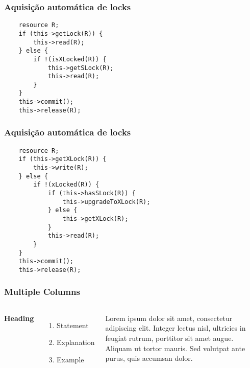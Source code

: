 \documentclass{beamer}
\begin{document}

\begin{frame}[fragile] %
\frametitle{Aquisição automática de locks}
\begin{example}
\begin{verbatim}
    resource R;
    if (this->getLock(R)) {
        this->read(R);
    } else {
        if !(isXLocked(R)) {
            this->getSLock(R);
            this->read(R);
        }
    }
    this->commit();
    this->release(R);

\end{verbatim}
\end{example}
\end{frame}


\begin{frame}[fragile] %
\frametitle{Aquisição automática de locks}
\begin{example}
\begin{verbatim}
    resource R;
    if (this->getXLock(R)) {
        this->write(R);
    } else {
        if !(xLocked(R)) {
            if (this->hasSLock(R)) {
                this->upgradeToXLock(R);
            } else {
                this->getXLock(R);
            }
            this->read(R);
        }
    }
    this->commit();
    this->release(R);

\end{verbatim}
\end{example}
\end{frame}



\begin{frame}
\frametitle{Multiple Columns}
\begin{columns}[c] %

\textbf{Heading}
\begin{enumerate}
\item Statement
\item Explanation
\item Example
\end{enumerate}

Lorem ipsum dolor sit amet, consectetur adipiscing elit. Integer lectus nisl, ultricies in feugiat rutrum, porttitor sit amet augue. Aliquam ut tortor mauris. Sed volutpat ante purus, quis accumsan dolor.

\end{columns}
\end{frame}
\end{document}
